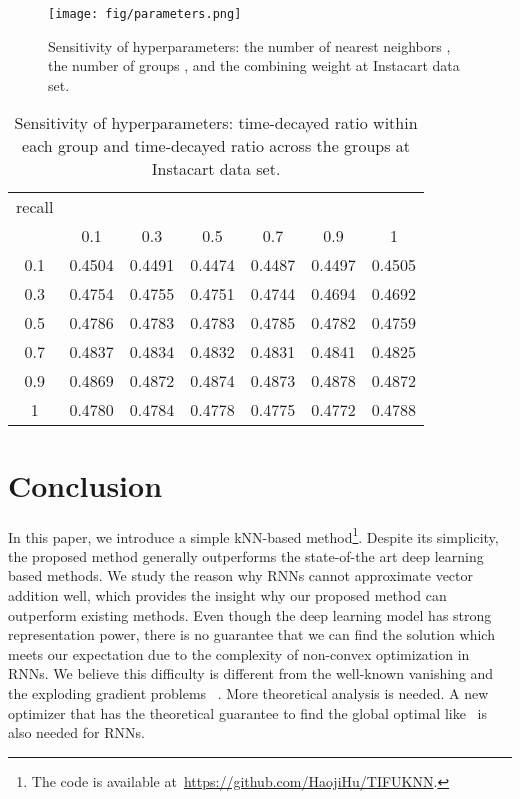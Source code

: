 \documentclass[sigconf]{acmart}
\begin{document}
\begin{figure}[!t]
\centerline{\texttt{[image: fig/parameters.png]}}
\caption{Sensitivity of hyperparameters: the number of nearest neighbors , the number of groups , and the combining weight   at Instacart data set.}
\label{fig:parameter}
\end{figure}

\begin{table}[ht]
\small
\caption{Sensitivity of hyperparameters: time-decayed ratio  within each group and time-decayed ratio   across the groups at Instacart data set.}
\centering
\begin{tabular}{ccccccc}
\toprule 

recall&&&&&&\\
 &0.1&0.3&0.5&0.7&0.9&1\\
 \hline
 0.1&0.4504
    &0.4491
    &0.4474
    &0.4487	&0.4497
    &0.4505

\\
 0.3&0.4754
	&0.4755
	&0.4751
	&0.4744
	&0.4694
    &0.4692

\\
 0.5&0.4786
	&0.4783
	&0.4783
	&0.4785
	&0.4782
    &0.4759

\\
 0.7&0.4837
	&0.4834
	&0.4832
	&0.4831
	&0.4841
    &0.4825

\\
 0.9&0.4869
	&0.4872
	&0.4874
    &0.4873
	&0.4878
    &0.4872

\\
 1&0.4780
	&0.4784
	&0.4778
	&0.4775
	&0.4772
    &0.4788

\\
\bottomrule
\end{tabular}
\label{tab:param_sensitive}
\end{table}


\section{Conclusion}
\label{sec:conclusion}

In this paper, we introduce a simple kNN-based method\footnote{The code is available at~\url{https://github.com/HaojiHu/TIFUKNN}.}. Despite its simplicity, the proposed method generally outperforms the state-of-the art deep learning based methods.  We study the reason why RNNs cannot  approximate vector addition well, which provides the  insight why our proposed method can outperform existing methods. Even though the deep learning  model has strong representation  power, there is no guarantee that we can find the solution which meets our expectation due to the complexity of non-convex  optimization in RNNs. We believe this difficulty is  different from the  well-known  vanishing and the exploding gradient  problems  ~\cite{pascanu2013difficulty}.  More theoretical analysis is needed. A new optimizer that  has the theoretical  guarantee to find the global optimal like~\cite{wang2019learning} is also  needed for RNNs. 
\end{document}
